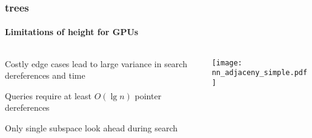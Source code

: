 \begin{frame}
  \frametitle{\kd trees}
  \framesubtitle{Limitations of height for GPUs}

  \begin{columns}[T]
    \begin{column}{.5\textwidth}
      \begin{block}{}%
        {\color{white} \bullet\hspace{1mm} Costly edge cases lead to large variance in search dereferences 
          and time\\\vspace{0.5cm}
        
        \bullet\hspace{1mm} Queries require at least $O(\lg n)$ pointer dereferences\\\vspace{0.5cm}

      \bullet\hspace{1mm} Only single subspace look ahead during search}
      \end{block}
    \end{column}
    \begin{column}{.5\textwidth}
      \begin{block}{}
        \texttt{[image: nn\_adjaceny\_simple.pdf]}
      \end{block}
    \end{column}
  \end{columns}
\end{frame}
